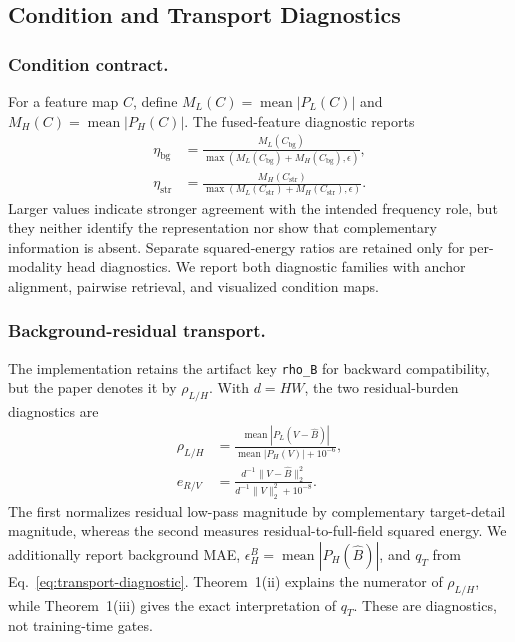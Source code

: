 \documentclass[letterpaper]{article}
\begin{document}
\subsection{Condition and Transport Diagnostics}
\subsubsection{Condition contract.}
\label{app:condition-diagnostics}
For a feature map $C$, define $M_L(C)=\operatorname{mean}|P_L(C)|$ and $M_H(C)=\operatorname{mean}|P_H(C)|$. The fused-feature diagnostic reports
\begin{align}
\eta_{\mathrm{bg}}&=\frac{M_L(C_{\mathrm{bg}})}{\max(M_L(C_{\mathrm{bg}})+M_H(C_{\mathrm{bg}}),\epsilon)},\\
\eta_{\mathrm{str}}&=\frac{M_H(C_{\mathrm{str}})}{\max(M_L(C_{\mathrm{str}})+M_H(C_{\mathrm{str}}),\epsilon)}.
\end{align}
Larger values indicate stronger agreement with the intended frequency role, but they neither identify the representation nor show that complementary information is absent. Separate squared-energy ratios are retained only for per-modality head diagnostics. We report both diagnostic families with anchor alignment, pairwise retrieval, and visualized condition maps.

\subsubsection{Background-residual transport.}
\label{app:background-diagnostics}
The implementation retains the artifact key \texttt{rho\_B} for backward compatibility, but the paper denotes it by $\rho_{L/H}$. With $d=HW$, the two residual-burden diagnostics are
\begin{align}
\rho_{L/H}
&=\frac{\operatorname{mean}|P_L(V-\hat B)|}
{\operatorname{mean}|P_H(V)|+10^{-6}},\\
e_{R/V}
&=\frac{d^{-1}\|V-\hat B\|_2^2}
{d^{-1}\|V\|_2^2+10^{-8}}.
\end{align}
The first normalizes residual low-pass magnitude by complementary target-detail magnitude, whereas the second measures residual-to-full-field squared energy. We additionally report background MAE, $\epsilon_H^B=\operatorname{mean}|P_H(\hat B)|$, and $q_T$ from Eq.~\ref{eq:transport-diagnostic}. Theorem~1(ii) explains the numerator of $\rho_{L/H}$, while Theorem~1(iii) gives the exact interpretation of $q_T$. These are diagnostics, not training-time gates.
\end{document}
